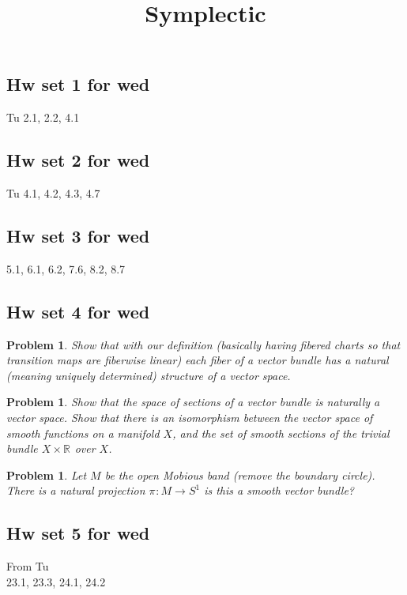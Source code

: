 \documentclass{amsart}
\numberwithin{equation}{section}
\newtheorem{problem}[equation]{Problem}
\theoremstyle{definition}
\theoremstyle{remark}
\begin{document}
\title{Symplectic}
\maketitle
\subsection*{Hw set 1 for wed}
Tu 2.1, 2.2, 4.1
\subsection*{Hw set 2 for wed}
Tu 4.1, 4.2, 4.3, 4.7
\subsection*{Hw set 3 for wed}
5.1, 6.1, 6.2, 7.6, 8.2, 8.7
\subsection*{Hw set 4 for wed}
\begin{problem}
Show that with our definition (basically having fibered
charts so that transition maps are fiberwise linear) each fiber of a vector bundle
has a natural (meaning uniquely determined) structure of
a vector space.	
\end{problem}
\begin{problem}
Show that the space of sections of a vector bundle is
naturally a vector space.
Show that there is an isomorphism between the vector space
of smooth functions on a manifold $X$, and the set of
smooth sections of the trivial bundle $X \times \mathbb{R} ^{} $ over $X$.
\end{problem}
\begin{problem}
Let $M$ be the open Mobious band (remove the boundary
circle). There is a natural projection $\pi _{}: M \to
S ^{1}$ is this a smooth vector bundle?  
\end{problem}

\subsection*{Hw set 5 for wed}
From Tu \\
23.1, 23.3, 24.1, 24.2

\end{document}
